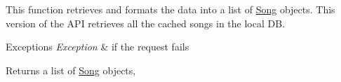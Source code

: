 This function retrieves and formats the data into a list of \hyperlink{classbridges_1_1_song}{Song} objects. This version of the A\+P\+I retrieves all the cached songs in the local D\+B.


\begin{DoxyExceptions}{Exceptions}
{\em Exception} & if the request fails\\
\hline
\end{DoxyExceptions}
\begin{DoxyReturn}{Returns}
a list of \hyperlink{classbridges_1_1_song}{Song} objects, 
\end{DoxyReturn}
